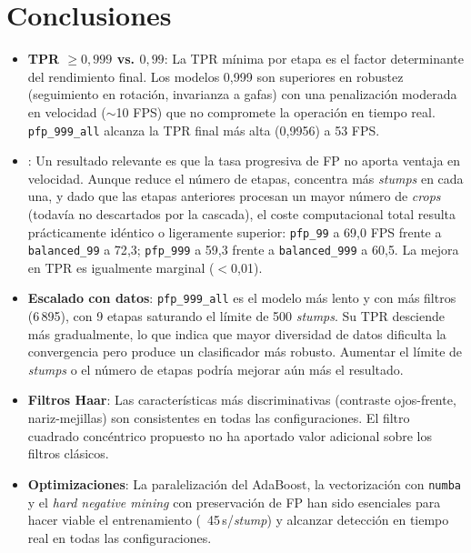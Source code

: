 \documentclass[11pt,spanish,listoffigures,listoftables]{tfgetsinf}
\begin{document}
\section{Conclusiones}

\begin{itemize}
    \item \textbf{TPR $\geq 0{,}999$ vs. $0{,}99$}: La TPR mínima por etapa es el factor determinante del rendimiento final. Los modelos 0{,}999 son superiores en robustez (seguimiento en rotación, invarianza a gafas) con una penalización moderada en velocidad ($\sim$10 FPS) que no compromete la operación en tiempo real. \texttt{pfp\_999\_all} alcanza la TPR final más alta (0,9956) a 53 FPS.

    \item {}: Un resultado relevante es que la tasa progresiva de FP no aporta ventaja en velocidad. Aunque reduce el número de etapas, concentra más \textit{stumps} en cada una, y dado que las etapas anteriores procesan un mayor número de \textit{crops} (todavía no descartados por la cascada), el coste computacional total resulta prácticamente idéntico o ligeramente superior: \texttt{pfp\_99} a 69{,}0 FPS frente a \texttt{balanced\_99} a 72{,}3; \texttt{pfp\_999} a 59{,}3 frente a \texttt{balanced\_999} a 60{,}5. La mejora en TPR es igualmente marginal ($<$0{,}01).

    \item \textbf{Escalado con datos}: \texttt{pfp\_999\_all} es el modelo más lento y con más filtros (6\,895), con 9 etapas saturando el límite de 500 \textit{stumps}. Su TPR desciende más gradualmente, lo que indica que mayor diversidad de datos dificulta la convergencia pero produce un clasificador más robusto. Aumentar el límite de \textit{stumps} o el número de etapas podría mejorar aún más el resultado.

    \item \textbf{Filtros Haar}: Las características más discriminativas (contraste ojos-frente, nariz-mejillas) son consistentes en todas las configuraciones. El filtro cuadrado concéntrico propuesto no ha aportado valor adicional sobre los filtros clásicos.

    \item \textbf{Optimizaciones}: La paralelización del AdaBoost, la vectorización con \texttt{numba} y el \textit{hard negative mining} con preservación de FP han sido esenciales para hacer viable el entrenamiento (~45\,s/\textit{stump}) y alcanzar detección en tiempo real en todas las configuraciones.
\end{itemize}
\end{document}
